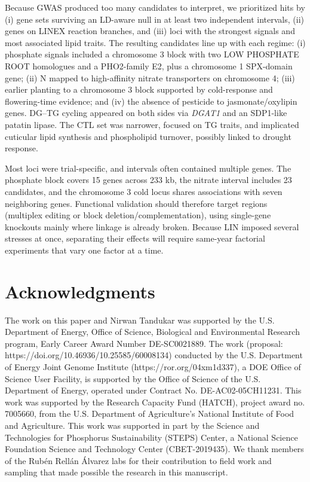 \documentclass[9pt,twocolumn,twoside]{rilabRxiv}
\begin{document}
Because GWAS produced too many candidates to interpret, we prioritized hits by (i) gene sets surviving an LD-aware null in at least two independent intervals, (ii) genes on LINEX reaction branches, and (iii) loci with the strongest signals and most associated lipid traits. The resulting candidates line up with each regime: (i) phosphate signals included a chromosome 3 block with two LOW PHOSPHATE ROOT homologues and a PHO2-family E2, plus a chromosome 1 SPX-domain gene; (ii) N mapped to high-affinity nitrate transporters on chromosome 4; (iii) earlier planting to a chromosome 3 block supported by cold-response and flowering-time evidence; and (iv) the absence of pesticide to jasmonate/oxylipin genes. DG--TG cycling appeared on both sides via \textit{DGAT1} and an SDP1-like patatin lipase. The CTL set was narrower, focused on TG traits, and implicated cuticular lipid synthesis and phospholipid turnover, possibly linked to drought response.

Most loci were trial-specific, and intervals often contained multiple genes. The phosphate block covers 15 genes across 233 kb, the nitrate interval includes 23 candidates, and the chromosome 3 cold locus shares associations with seven neighboring genes. Functional validation should therefore target regions (multiplex editing or block deletion/complementation), using single-gene knockouts mainly where linkage is already broken. Because LIN imposed several stresses at once, separating their effects will require same-year factorial experiments that vary one factor at a time.


\section{Acknowledgments}
The work on this paper and Nirwan Tandukar was supported by the U.S. Department of Energy, Office of Science, Biological and Environmental Research program, Early Career Award Number DE-SC0021889.
The work (proposal: https://doi.org/10.46936/10.25585/60008134) conducted by the U.S. Department of Energy Joint Genome Institute (https://ror.org/04xm1d337), a DOE Office of Science User Facility, is supported by the Office of Science of the U.S. Department of Energy, operated under Contract No. DE-AC02-05CH11231. This work was supported by the Research Capacity Fund (HATCH), project award no. 7005660, from the U.S. Department of Agriculture’s National Institute of Food and Agriculture.  
This work was supported in part by the Science and Technologies for Phosphorus Sustainability (STEPS) Center, a National Science Foundation Science and Technology Center (CBET-2019435).
We thank members of the Rubén Rellán Álvarez labs for their contribution to field work and sampling that made possible the research in this manuscript.
\end{document}
